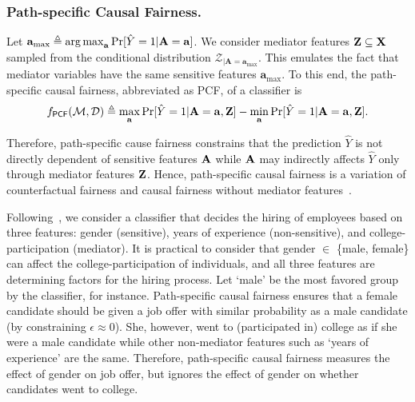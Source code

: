 \subsubsection{Path-specific Causal Fairness.}
Let $ \mathbf{a}_{\max}  \triangleq \operatorname*{arg\,max}_{ \mathbf{a}} \Pr[\hat{Y} =1 |\mathbf{A}=  \mathbf{a}] $. We consider mediator features $ \mathbf{Z} \subseteq \mathbf{X} $ sampled from the conditional distribution $ {\mathcal{Z}_{|\mathbf{A} = \mathbf{a}_{\max}}} $. This emulates the fact that mediator variables have the same sensitive features $ \mathbf{a}_{\max} $.   To this end, the path-specific causal fairness, abbreviated as PCF, of a classifier is \[
 f_{\mathsf{PCF}}(\mathcal{M}, \mathcal{D}) \triangleq \max_{\mathbf{a}}\Pr[\hat{Y} = 1 | \mathbf{A} =  \mathbf{a}, \mathbf{Z}] - \min_{\mathbf{a}} \Pr[\hat{Y} = 1 | \mathbf{A} = \mathbf{a}, \mathbf{Z} ].
\]



Therefore, path-specific cause fairness constrains that the prediction $ \hat{Y} $ is not directly dependent of sensitive features $ \mathbf{A} $ while $ \mathbf{A} $ may indirectly affects $ \hat{Y} $ only through mediator features $ \mathbf{Z} $. Hence, path-specific causal fairness is a variation of counterfactual fairness and causal fairness without mediator features~\cite{bastani2019probabilistic}. 




\begin{example}
	Following~\cite{bastani2019probabilistic}, we consider a classifier that decides the hiring of employees based on three features: gender (sensitive), years of experience (non-sensitive), and college-participation (mediator). It is practical to consider that gender $ \in $ \{male, female\} can affect the college-participation of individuals, and all three features are determining factors for the hiring process. Let `male' be the most favored group by the classifier, for instance. Path-specific causal fairness ensures that a female candidate should be given a job offer with similar probability as a male candidate (by constraining $ \epsilon \approx 0 $). She,  however,  went to (participated in) college as if she were a male candidate while other non-mediator features such as  `years of experience' are the same.  Therefore, path-specific causal fairness measures the effect of gender on job offer, but ignores the effect of gender on whether candidates went to college.
\end{example}	



